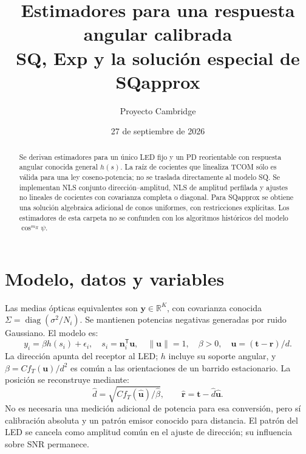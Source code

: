 \documentclass[11pt,a4paper]{article}
\title{Estimadores para una respuesta angular calibrada\\\large SQ, Exp y la solución especial de SQapprox}
\author{Proyecto Cambridge}
\date{27 de septiembre de 2026}
\begin{document}
\maketitle
\begin{abstract}
Se derivan estimadores para un único LED fijo y un PD reorientable con respuesta angular conocida general $h(s)$. La raíz de cocientes que linealiza TCOM sólo es válida para una ley coseno-potencia; no se traslada directamente al modelo SQ. Se implementan NLS conjunto dirección--amplitud, NLS de amplitud perfilada y ajustes no lineales de cocientes con covarianza completa o diagonal. Para SQapprox se obtiene una solución algebraica adicional de conos uniformes, con restricciones explícitas. Los estimadores de esta carpeta no se confunden con los algoritmos históricos del modelo $\cos^{m_R}\psi$.
\end{abstract}
\tableofcontents
\clearpage

\section{Modelo, datos y variables}
Las medias ópticas equivalentes son $\mathbf y\in\mathbb R^K$, con covarianza conocida $\Sigma=\operatorname{diag}(\sigma^2/N_i)$. Se mantienen potencias negativas generadas por ruido Gaussiano. El modelo es:
\begin{equation}
 y_i=\beta h(s_i)+\epsilon_i,\quad s_i=\mathbf n_i^{\mathsf T}\mathbf u,\quad
 \|\mathbf u\|=1,\quad \beta>0,\quad \mathbf u=(\mathbf t-\mathbf r)/d.
\end{equation}
La dirección apunta del receptor al LED; $h$ incluye su soporte angular, y $\beta=Cf_T(\mathbf u)/d^2$ es común a las orientaciones de un barrido estacionario. La posición se reconstruye mediante:
\begin{equation}
 \hat d=\sqrt{Cf_T(\hat{\mathbf u})/\hat\beta},\qquad
 \hat{\mathbf r}=\mathbf t-\hat d\hat{\mathbf u}.
\label{eq:range}
\end{equation}
No es necesaria una medición adicional de potencia para esa conversión, pero sí calibración absoluta y un patrón emisor conocido para distancia. El patrón del LED se cancela como amplitud común en el ajuste de dirección; su influencia sobre SNR permanece.
\end{document}
